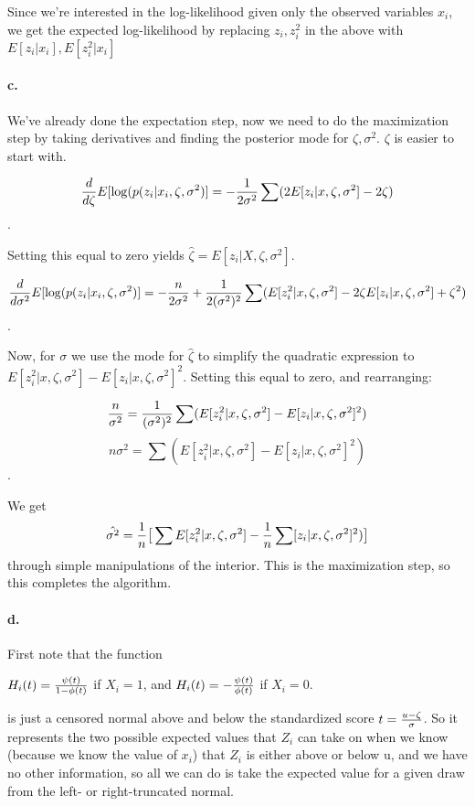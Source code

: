 \documentclass{article}
\begin{document}
Since we're interested in the log-likelihood given only the observed variables \(x_i\), we get the expected log-likelihood
by replacing \(z_i, z_i^2\) in the above with \(E[z_i \vert x_i], E[z_i^2 \vert x_i]\)

\paragraph{c.}

We've already done the expectation step, now we need to do the maximization step by taking derivatives
and finding the posterior mode for \(\zeta, \sigma^2\). \(\zeta\) is easier to start with.

\[{d \over d\zeta} E[\log(p(z_i \vert x_i, \zeta, \sigma^2)] =  -{1 \over 2\sigma^2} \sum (2E[z_i \vert x, \zeta, \sigma^2] - 2\zeta)\].

Setting this equal to zero yields \(\hat{\zeta} = E[z_i \vert X, \zeta, \sigma^2]\). 

\[{d \over d\sigma^2} E[\log(p(z_i \vert x_i, \zeta, \sigma^2)] =  
-{n \over 2\sigma^2} + {1 \over 2(\sigma^2)^2} \sum ( E[z_i^2 \vert x, \zeta, \sigma^2] - 2\zeta E[z_i \vert x, \zeta, \sigma^2]  + \zeta^2)\].

Now, for \(\sigma\) we use the mode for \(\hat{\zeta}\)
to simplify the quadratic expression to \(E[z_i^2 \vert x, \zeta, \sigma^2] - E[z_i \vert x, \zeta, \sigma^2]^2\). Setting this equal to zero, and rearranging:

\[{n \over \sigma^2} = {1 \over (\sigma^2)^2} \sum (E[z_i^2 \vert x, \zeta, \sigma^2] - E[z_i \vert x, \zeta, \sigma^2]^2)\]
\[n\sigma^2 = \sum (E[z_i^2 \vert x, \zeta, \sigma^2] - E[z_i \vert x, \zeta, \sigma^2]^2)\].

We get \[\hat{\sigma^2} = {1\over n}\big[ \sum E[z_i^2 \vert x, \zeta, \sigma^2] - {1 \over n} \sum[z_i \vert x, \zeta, \sigma^2]^2) \big] \] 
through simple manipulations of the interior. This is the maximization step, so this completes the algorithm.

\paragraph{d.}

First note that the function

\(H_i(t) = {\psi(t) \over 1 - \phi(t)}\) if \(X_i = 1\), and
\(H_i(t) = -{\psi(t) \over \phi(t)}\) if \(X_i = 0\).

is just a censored normal above and below the standardized score \(t = {u - \zeta \over \sigma}\).
So it represents the two possible expected values that \(Z_i\) can take on when we know
(because we know the value of \(x_i\)) that \(Z_i\) is either above or below u, and we 
have no other information, so all we can do is take the expected value for a given draw
from the left- or right-truncated normal.
\end{document}
